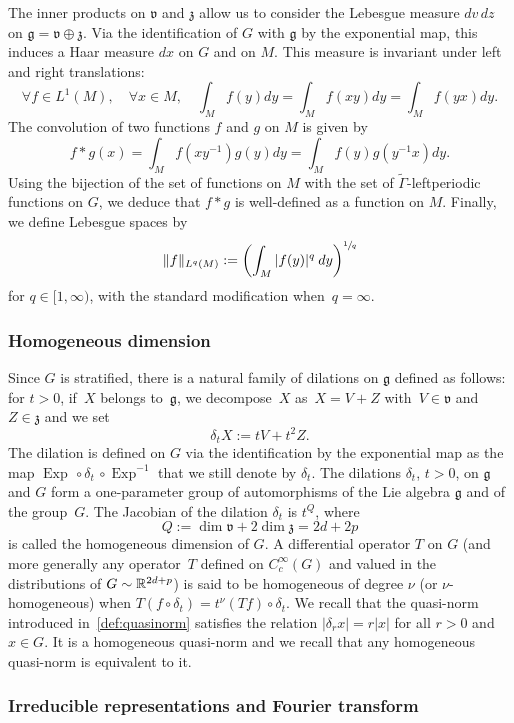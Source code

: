 \documentclass[10pt]{amsart}
\DeclareMathOperator{\Exp}{Exp}
\theoremstyle{plain}
\theoremstyle{definition}
\def\R{{\mathbb R}}
\begin{document}
The inner products on $\mathfrak v$ and ${\mathfrak z}$ allow us to consider the Lebesgue measure $dv\, dz$ on ${\mathfrak g}={\mathfrak v}\oplus{\mathfrak z}$. Via the identification of $G$ with ${\mathfrak g}$ by the exponential map, this induces a Haar measure $dx$ on $G$ and on $M$. This measure is invariant under left and right translations:
\[
\forall f \in L^1(M), \quad \forall x \in M, \quad \int_M f(y) dy = \int_M f(x y)dy= \int_M f(y x)dy.
\]
The convolution of two functions $f$ and $g$ on $M$ is given by
\[
f*g(x)=\int_M f(xy^{-1})g(y) dy=\int_Mf(y) g(y^{-1} x) dy.
\]
Using the bijection of the set of functions on $M$ with the set of $\widetilde{\Gamma}$-leftperiodic functions on $G$, we deduce that $f*g$ is well-defined as a function on $M$.
Finally, we define Lebesgue spaces by
\[
\|f\|_{L^q (M)} := \biggl(\int_M |f(y)|^q \: dy \biggr)^{\sfrac1q}
\]
for $q\in[1,\infty)$, with the standard modification when~$q=\infty$.

\subsubsection{Homogeneous dimension}
Since $G$ is stratified, there is a natural family of dilations on ${\mathfrak g}$ defined as follows: for $t>0$, if~$X$ belongs to~$ {\mathfrak g}$, we decompose~$X$ as~$ X=V+Z$ with~$V\in {\mathfrak v}$ and~$Z\in {\mathfrak z}$ and we set
\[
\delta_t X:=tV+t^2Z.
\]
The dilation is defined on $G$ via the identification by the exponential map as the map $\Exp\, \circ \delta_t \, \circ \Exp^{-1}$ that we still denote by $\delta_t$.
The dilations $\delta_t$, $t>0$, on $\mathfrak g$ and $G$ form a one-parameter group of automorphisms of the Lie algebra $\mathfrak g$ and of the group~$G$.
The Jacobian of the dilation $\delta_t$ is $t^Q$, where
\[
Q:=\dim {\mathfrak v} +2\dim {\mathfrak z} = 2d+2p
\]
is called the homogeneous dimension of $G$.
A differential operator $T$ on $G$
(and more generally any operator~$T$ defined on $C^\infty_c(G)$ and valued in the distributions of $G\sim\nobreak \R^{2d+p}$)
is said to be homogeneous of degree $\nu$ (or $\nu$-homogeneous) when
$
T (f\circ \delta_t) = t^\nu (Tf)\circ \delta_t.
$
We recall that the quasi-norm introduced in~\eqref{def:quasinorm} satisfies the relation $|\delta_r x|= r|x|$ for all $r>0$ and $x\in G$. It is a homogeneous quasi-norm and we recall that any homogeneous quasi-norm is equivalent to it.

\subsubsection{Irreducible representations and Fourier transform}
\end{document}
